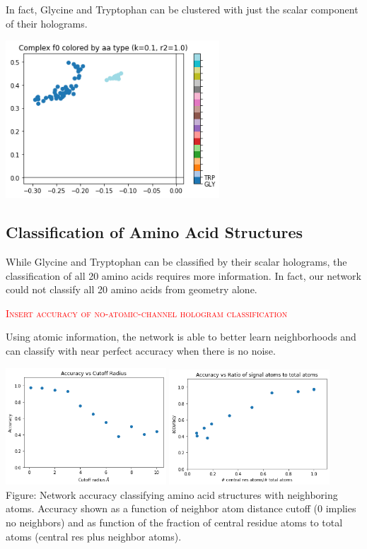 \documentclass{article}
\begin{document}
In fact, Glycine and Tryptophan can be clustered with just the scalar component of their holograms.
\begin{center}
    \includegraphics[width=8cm]{GLY-TRP 00.png}\\
    \color{red}{Double check the labeling of GLY and TRP here. Clean up the legend}
\end{center}

\subsection{Classification of Amino Acid Structures}

While Glycine and Tryptophan can be classified by their scalar holograms, the classification of all 20 amino acids requires more information. In fact, our network could not classify all 20 amino acids from geometry alone.

\textcolor{red}{\textsc{Insert accuracy of no-atomic-channel hologram classification}}

Using atomic information, the network is able to better learn neighborhoods and can classify with near perfect accuracy when there is no noise.
\begin{center}
\includegraphics[width=6cm]{accVsR.png}
\includegraphics[width=6cm]{accVsNoise.png}\\
Figure: Network accuracy classifying amino acid structures with neighboring atoms. Accuracy shown as a function of neighbor atom distance cutoff (0 implies no neighbors) and as function of the fraction of central residue atoms to total atoms (central res plus neighbor atoms).\\
\color{red}{Redo figure with tf2 network and record network parameters}
\end{center} 
\end{document}
